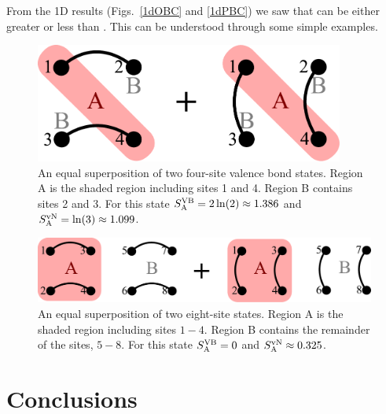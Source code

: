 From the 1D results (Figs.~\ref{1dOBC} and \ref{1dPBC}) we saw that \vb can be either greater or less than \vN.
This can be understood through some simple examples.

\begin{figure}
\centering
\includegraphics[width=4in]{./figures/made/example1.pdf}
\caption[A superposition of two four-site valence bond states]{An equal superposition of two four-site valence bond states.  
Region A is the shaded region including sites 1 and 4.
Region B contains sites 2 and 3.
For this state $S^{\text{VB}}_{\rm A}=2\ln(2)\approx1.386$ and $S^{\text{vN}}_{\rm A}=\ln(3)\approx 1.099$.
}
\end{figure}

\begin{figure}
\centering
\includegraphics[width=6in]{./figures/made/example2.pdf}
\caption[A superposition of two eight-site valence bond states]{An equal superposition of two eight-site states.
Region A is the shaded region including sites $1-4$.  
Region B contains the remainder of the sites, $5-8$.
For this state $S^{\text{VB}}_{\rm A}=0$ and $S^{\text{vN}}_{\rm A}\approx 0.325$.}
\end{figure}









\section{Conclusions}
